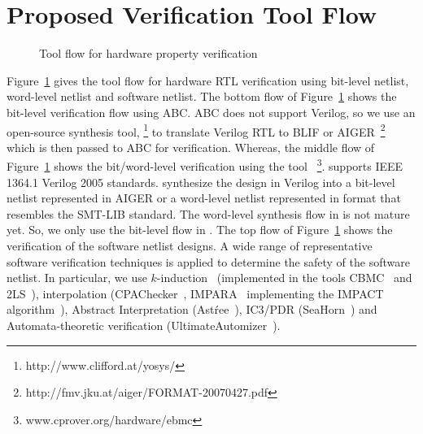 \section{Proposed Verification Tool Flow}
%
\begin{figure}[t]
\centering
\vspace*{0.3cm}
\caption{Tool flow for hardware property verification\label{fig:toolflow}}
\end{figure}
%
%
Figure~\ref{fig:toolflow} gives the tool flow for hardware RTL 
verification using bit-level netlist, word-level netlist and software netlist.  
The bottom flow of Figure~\ref{fig:toolflow} shows the bit-level 
verification flow using ABC.
ABC does not support Verilog, so we use an open-source synthesis tool,
\yosys\footnote{http://www.clifford.at/yosys/} to translate Verilog
RTL to BLIF or AIGER~\footnote{http://fmv.jku.at/aiger/FORMAT-20070427.pdf} 
which is then passed to ABC for verification. 
Whereas, the middle flow of Figure~\ref{fig:toolflow} shows the 
bit/word-level verification using the tool 
\ebmc~\footnote{www.cprover.org/hardware/ebmc}. 
\ebmc supports IEEE 1364.1 Verilog 2005 standards.  \ebmc synthesize 
the design in Verilog into a bit-level netlist represented in AIGER or a 
word-level netlist represented in format that resembles the 
SMT-LIB standard. The word-level synthesis flow in \ebmc is not mature yet. 
So, we only use the bit-level flow in \ebmc. 
%
The top flow of Figure~\ref{fig:toolflow} shows the verification 
of the software netlist designs. 
%
A wide range of representative software 
verification techniques is applied to determine the safety of the
software netlist. In particular, we use $k$-induction~\cite{SSS00}
(implemented in the tools CBMC~\cite{cbmc.tacas:2004} and
2LS~\cite{BJKS15}), interpolation
(CPAChecker~\cite{DBLP:conf/cav/BeyerK11}, IMPARA~\cite{impara}
implementing the IMPACT algorithm~\cite{cav03}), Abstract Interpretation
(Ast{\'r}ee~\cite{DBLP:conf/esop/CousotCFMMMR05}), IC3/PDR
(SeaHorn~\cite{DBLP:conf/cav/GurfinkelKKN15}) and Automata-theoretic 
verification (UltimateAutomizer~\cite{DBLP:conf/tacas/HeizmannDGLMSP16}).
%
